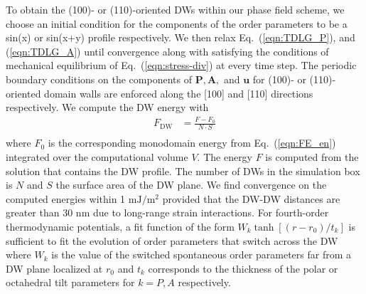 \documentclass[%
 reprint,
superscriptaddress,
 amsmath,amssymb,
prb,
]{revtex4-1}
\begin{document}
To obtain the (100)- or (110)-oriented DWs within our phase field scheme, we choose an initial condition for the components of the order parameters to be a sin(x) or sin(x+y) profile respectively.
%
We then relax Eq.~(\ref{eqn:TDLG_P}), and (\ref{eqn:TDLG_A}) until convergence along with satisfying the conditions of mechanical equilibrium of Eq.~(\ref{eqn:stress-div}) at every time step.
%
The periodic boundary conditions on the components of $\mathbf{P},\mathbf{A},$ and $\mathbf{u}$ for (100)- or (110)-oriented domain walls are enforced along the [100] and [110] directions respectively.
%
We compute the DW energy with
%
\begin{equation}\label{eqn:enDW}
\begin{aligned}
    F_\mathrm{DW} &= \frac{F - F_0}{N\cdot S} \\
\end{aligned}
\end{equation}
%
where $F_0$ is the corresponding monodomain energy from Eq.~(\ref{eqn:FE_en}) integrated over the computational volume $V$. 
%
The energy $F$ is computed from the solution that contains the DW profile.
%
The number of DWs in the simulation box is $N$ and $S$ the surface area of the DW plane.
%
We find convergence on the computed energies within 1 $\mathrm{mJ}/\mathrm{m}^2$ provided that the DW-DW distances are greater than 30 nm due to long-range strain interactions.
%
For fourth-order thermodynamic potentials, a fit function of the form $W_k \tanh{\left[\left(r-r_0\right)/t_k\right]}$ is sufficient to fit the evolution of order parameters that switch across the DW\cite{Marton2010} where $W_k$ is the value of the switched spontaneous order parameters far from a DW plane localized at $r_0$ and $t_k$ corresponds to the thickness of the polar or octahedral tilt parameters for $k = P,A$ respectively.
%
\end{document}
